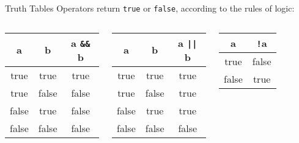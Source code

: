 \documentclass[../lecture3-flowofcontrol.tex]{subfiles}
\begin{document}
\begin{frame}[fragile]{Truth Tables}
    Operators return \texttt{true} or \texttt{false}, according to the rules of logic:

    \begin{columns}[T,onlytextwidth]
            \begin{table}
                \begin{tabular}{c|c|c}
                    \toprule
                    \textbf{a} & \textbf{b} & \bfseries{a \verb|&&| b} \\
                    \midrule
                    true  & true  & true  \\
                    true  & false & false \\
                    false & true  & false \\
                    false & false & false \\
                    \bottomrule
                \end{tabular}
            \end{table}
            \begin{table}
                \begin{tabular}{c|c|c}
                    \toprule
                    \textbf{a} & \textbf{b} & \bfseries{a \verb+||+ b} \\
                    \midrule
                    true  & true  & true  \\
                    true  & false & true  \\
                    false & true  & true  \\
                    false & false & false \\
                    \bottomrule
                \end{tabular}
            \end{table}
            \begin{table}
                \begin{tabular}{c|c}
                    \toprule
                    \textbf{a} & \bfseries{\verb|!|a} \\
                    \midrule
                    true  & false \\
                    false & true  \\
                    \bottomrule
                \end{tabular}
            \end{table}
    \end{columns}


\end{frame}
\end{document}

